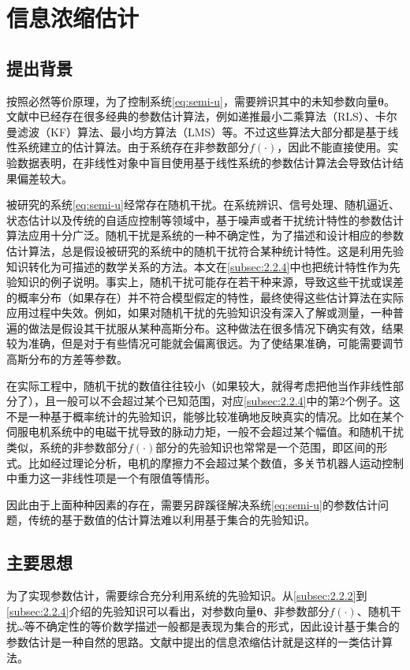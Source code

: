 \section{信息浓缩估计}
\label{sect:2.3}
\subsection{提出背景}
\label{subsec:2.3.1}
按照必然等价原理，为了控制系统\eqref{eq:semi-u}，需要辨识其中的未知参数向量$\bm{\theta}$。文献中已经存在很多经典的参数估计算法，例如递推最小二乘算法（RLS）、卡尔曼滤波（KF）算法、最小均方算法（LMS）等。不过这些算法大部分都是基于线性系统建立的估计算法。由于系统存在非参数部分$f(\cdot)$，因此不能直接使用。实验数据表明，在非线性对象中盲目使用基于线性系统的参数估计算法会导致估计结果偏差较大。

被研究的系统\eqref{eq:semi-u}经常存在随机干扰。在系统辨识、信号处理、随机逼近、状态估计以及传统的自适应控制等领域中，基于噪声或者干扰统计特性的参数估计算法应用十分广泛。随机干扰是系统的一种不确定性，为了描述和设计相应的参数估计算法，总是假设被研究的系统中的随机干扰符合某种统计特性。这是利用先验知识转化为可描述的数学关系的方法。本文在\ref{subsec:2.2.4}中也把统计特性作为先验知识的例子说明。事实上，随机干扰可能存在若干种来源，导致这些干扰或误差的概率分布（如果存在）并不符合模型假定的特性，最终使得这些估计算法在实际应用过程中失效。例如，如果对随机干扰的先验知识没有深入了解或测量，一种普遍的做法是假设其干扰服从某种高斯分布。这种做法在很多情况下确实有效，结果较为准确，但是对于有些情况可能就会偏离很远。为了使结果准确，可能需要调节高斯分布的方差等参数。

在实际工程中，随机干扰的数值往往较小（如果较大，就得考虑把他当作非线性部分了），且一般可以不会超过某个已知范围，对应\ref{subsec:2.2.4}中的第2个例子。这不是一种基于概率统计的先验知识，能够比较准确地反映真实的情况。比如在某个伺服电机系统中的电磁干扰导致的脉动力矩，一般不会超过某个幅值。和随机干扰类似，系统的非参数部分$f(\cdot)$部分的先验知识也常常是一个范围，即区间的形式。比如经过理论分析，电机的摩擦力不会超过某个数值，多关节机器人运动控制中重力这一非线性项是一个有限值等情形。

因此由于上面种种因素的存在，需要另辟蹊径解决系统\eqref{eq:semi-u}的参数估计问题，传统的基于数值的估计算法难以利用基于集合的先验知识。
\subsection{主要思想}
\label{subsec:2.3.2}
为了实现参数估计，需要综合充分利用系统的先验知识。从\ref{subsec:2.2.2}到\ref{subsec:2.2.4}介绍的先验知识可以看出，对参数向量$\bm{\theta}$、非参数部分$f(\cdot)$、随机干扰$\omega$等不确定性的等价数学描述一般都是表现为集合的形式，因此设计基于集合的参数估计是一种自然的思路。文献\cite{MaLum2009}中提出的信息浓缩估计就是这样的一类估计算法。


